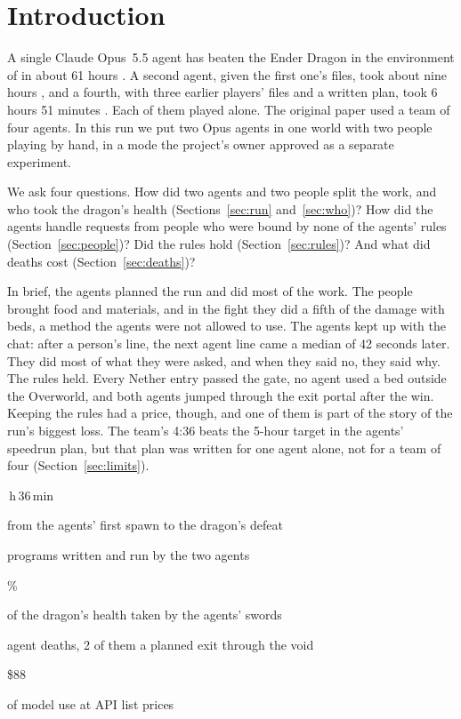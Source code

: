 \documentclass[11pt,a4paper]{article}
\newcommand{\statcell}[2]{%
  \begin{minipage}[t]{0.177\textwidth}\raggedright
    {\sffamily\fontsize{17}{20}\selectfont #1\par}\vspace{3pt}
    {\sffamily\fontsize{7}{8.6}\selectfont\color{inkgrey}#2\par}
  \end{minipage}}
\newcommand{\statsep}{\hspace{0.5em}{\color{rulegrey}\vrule width 0.6pt}\hspace{0.6em}}
\begin{document}
\clearpage
\section{Introduction}

A single Claude Opus~5.5 agent has beaten the Ender Dragon in the environment of \citet{faldor2026team} in about 61 hours \citep{batsuk2026single}. A second agent, given the first one's files, took about nine hours \citep{batsuk2026second}, and a fourth, with three earlier players' files and a written plan, took 6 hours 51 minutes \citep{batsuk2026fourth}. Each of them played alone. The original paper used a team of four agents. In this run we put two Opus agents in one world with two people playing by hand, in a mode the project's owner approved as a separate experiment.

We ask four questions. How did two agents and two people split the work, and who took the dragon's health (Sections~\ref{sec:run} and~\ref{sec:who})? How did the agents handle requests from people who were bound by none of the agents' rules (Section~\ref{sec:people})? Did the rules hold (Section~\ref{sec:rules})? And what did deaths cost (Section~\ref{sec:deaths})?

In brief, the agents planned the run and did most of the work. The people brought food and materials, and in the fight they did a fifth of the damage with beds, a method the agents were not allowed to use. The agents kept up with the chat: after a person's line, the next agent line came a median of 42 seconds later. They did most of what they were asked, and when they said no, they said why. The rules held. Every Nether entry passed the gate, no agent used a bed outside the Overworld, and both agents jumped through the exit portal after the win. Keeping the rules had a price, though, and one of them is part of the story of the run's biggest loss. The team's 4:36 beats the 5-hour target in the agents' speedrun plan, but that plan was written for one agent alone, not for a team of four (Section~\ref{sec:limits}).

\vspace{10pt}
\noindent\statcell{4\,h\,36\,min}{from the agents' first spawn to the dragon's defeat}%
\statsep\statcell{695}{programs written and run by the two agents}%
\statsep\statcell{61\%}{of the dragon's health taken by the agents' swords}%
\statsep\statcell{7}{agent deaths, 2 of them a planned exit through the void}%
\statsep\statcell{\$88}{of model use at API list prices}
\vspace{6pt}
\end{document}
